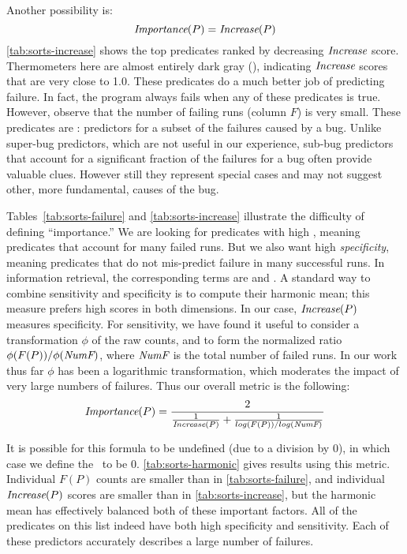 Another possibility is:
\[ \textit{Importance}(P) = \textit{Increase}(P) \]
\autoref{tab:sorts-increase} shows the top predicates ranked by
decreasing $\textit{Increase}$ score.  Thermometers here are almost entirely
dark gray (), indicating $\textit{Increase}$ scores that are very
close to 1.0.  These predicates do a much better job of predicting
failure.  In fact, the program always fails when any of these
predicates is true.  However, observe that the number of failing runs
(column $F$) is very small.  These predicates are : predictors for a subset of the failures caused by a
bug.  Unlike super-bug predictors, which are not useful in our
experience, sub-bug predictors that account for a significant fraction
of the failures for a bug often provide valuable clues.  However still
they represent special cases and may not suggest other, more
fundamental, causes of the bug.

Tables~\ref{tab:sorts-failure} and \ref{tab:sorts-increase} illustrate
the difficulty of defining ``importance.''  We are looking for
predicates with high , meaning predicates that
account for many failed runs.  But we also want high
\emph{specificity}, meaning predicates that do not mis-predict failure
in many successful runs.  In information retrieval, the corresponding
terms are  and .  A standard way to combine sensitivity
and specificity is to compute their harmonic mean; this measure
prefers high scores in both dimensions.  In our case, $\textit{Increase}(P)$
measures specificity.  For sensitivity, we have found it useful to
consider a transformation $\phi$ of the raw counts, and to form the
normalized ratio $\phi(F(P)) / \phi(\textit{NumF})$, where $\textit{NumF}$ is
the total number of failed runs.  In our work thus far $\phi$ has been
a logarithmic transformation, which moderates the impact of very large
numbers of failures.  Thus our overall metric is the following:
\[
\textit{Importance}(P) =
\frac{2}{
  \frac{1}{\textit{Increase}(P)}
  +
  \frac{1}{log(F(P)) / log(\textit{NumF})}}
\]

It is possible for this formula to be undefined (due to a division by 0),
in which case we define the \importance\ to be 0.
\autoref{tab:sorts-harmonic} gives results using this metric.
Individual $F(P)$ counts are smaller than in
\autoref{tab:sorts-failure}, and individual $\textit{Increase}(P)$ scores are
smaller than in \autoref{tab:sorts-increase}, but the harmonic mean
has effectively balanced both of these important factors.  All of the
predicates on this list indeed have both high specificity and
sensitivity.  Each of these predictors accurately describes a large
number of failures.

